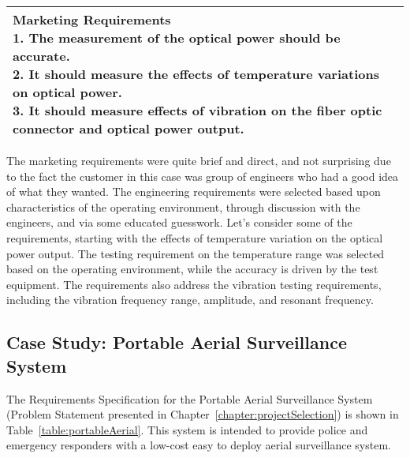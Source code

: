 \begin{longtable}{ |p{2.5cm}|p{5cm}|p{5.5cm}|}
\multicolumn{3}{|p{12cm}|}{
\textbf{Marketing Requirements} \newline
1.  The measurement of the optical power should be accurate.\newline
2.  It should measure the effects of temperature variations on optical power.\newline
3.  It should measure effects of vibration on the fiber optic connector
  and optical power output.}  \\ \hline
\end{longtable}

The marketing requirements were quite brief and direct, and not
surprising due to the fact the customer in this case was group of
engineers who had a good idea of what they wanted. The engineering
requirements were selected based upon characteristics of the operating
environment, through discussion with the engineers, and via some
educated guesswork. Let's consider some of the requirements, starting
with the effects of temperature variation on the optical power output.
The testing requirement on the temperature range was selected based on
the operating environment, while the accuracy is driven by the test
equipment. The requirements also address the vibration testing
requirements, including the vibration frequency range, amplitude, and
resonant frequency.

\subsection{Case Study: Portable Aerial Surveillance System}
\label{subsection:case-study-portable-aerial-surveillance-system}

The Requirements Specification for the Portable Aerial Surveillance
System (Problem Statement presented in 
Chapter~\ref{chapter:projectSelection}) is shown in Table~\ref{table:portableAerial}.
This system is intended to provide police and emergency responders with
a low-cost easy to deploy aerial surveillance system.

